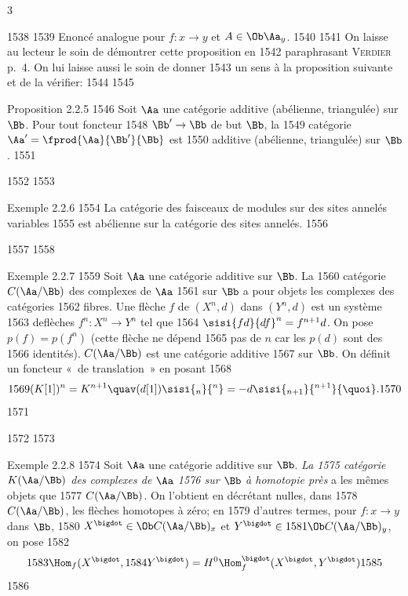 3	\documentclass[10pt]{../fichiers-configuration-latex/smfart}
\begin{document}
  1538	
  1539	Enoncé analogue pour $f:x\rightarrow y$ et $A\in \Ob \Aa_y$.
  1540	
  1541	On laisse au lecteur le soin de démontrer cette proposition en
  1542	paraphrasant \textsc{Verdier} \cite{CD} p.~4. On lui laisse aussi le soin de donner
  1543	un sens à la proposition suivante et de la vérifier:
  1544	
  1545	\begin{enonce*}{Proposition 2.2.5}
  1546	Soit $\Aa$ une catégorie additive (\resp abélienne, 	triangulée) sur $\Bb$. Pour tout foncteur
  1548	$\Bb'\rightarrow \Bb$ de but $\Bb$, la
  1549	catégorie $\Aa'=\fprod{\Aa}{\Bb'}{\Bb}$ est
  1550	additive (\resp abélienne, \resp triangulée) sur $\Bb$.
  1551	\end{enonce*}
  1552	
  1553	\begin{enonce*}[remark]{Exemple 2.2.6}
  1554	La catégorie des faisceaux de modules sur des sites annelés variables
  1555	est abélienne sur la catégorie des sites annelés.
  1556	\end{enonce*}
  1557	
  1558	\begin{enonce*}[remark]{Exemple 2.2.7}
  1559	Soit $\Aa$ une catégorie additive sur $\Bb$. La
  1560	catégorie $C(\Aa/\Bb)$ des complexes de $\Aa$
  1561	sur $\Bb$ a pour objets les complexes des catégories
  1562	fibres. Une flèche $f$ de $(X^n,d)$ dans $(Y^n,d)$ est un système
  1563	de\pageoriginale flèches $f^{n}:X^{n}\rightarrow Y^{n}$ tel que
  1564	$\sisi{fd}{df}^{n}=f^{n+1} d$. On pose $p(f)=p(f^{n})$ (cette flèche ne dépend
  1565	pas de $n$ car les $p(d)$ sont des
  1566	identités). $C(\Aa/\Bb)$ est une catégorie additive
  1567	sur $\Bb$. On définit un foncteur « de translation »  en posant
  1568	\[
  1569	(K[1])^{n}=K^{n+1}\quav (d[1])\sisi{_n}{^n}=-d\sisi{_{n+1}}{^{n+1}}{\quoi}.
  1570	\]
  1571	\end{enonce*}
  1572	
  1573	\begin{enonce*}[remark]{Exemple 2.2.8}
  1574	Soit $\Aa$ une catégorie additive sur $\Bb$. \emph{La
  1575	catégorie $K(\Aa/\Bb)$ des complexes de $\Aa$
  1576	sur $\Bb$ à homotopie près} a les mêmes objets que
  1577	$C(\Aa/\Bb)$. On l'obtient en décrétant nulles, dans
  1578	$C(\Aa/\Bb)$, les flèches homotopes à zéro; en
  1579	d'autres termes, pour $f:x\rightarrow y$ dans $\Bb$,
  1580	$X^{\bigdot}\in \Ob C(\Aa/\Bb)_x$ et $Y^{\bigdot}\in
  1581	\Ob C(\Aa/\Bb)_y$, on pose
  1582	\[
  1583	\Hom_f(X^{\bigdot},
  1584	Y^{\bigdot})=H^{0}\Hom^{\bigdot}_f(X^{\bigdot},Y^{\bigdot})
  1585	\]
  1586	\end{enonce*}
\end{document}
